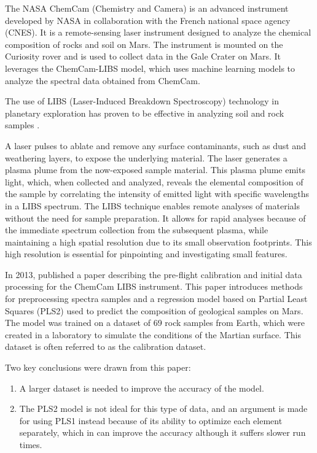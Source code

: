 
The NASA ChemCam (Chemistry and Camera) is an advanced instrument developed by NASA in collaboration with the French national space agency (CNES).
It is a remote-sensing laser instrument designed to analyze the chemical composition of rocks and soil on Mars\cite{chemcam_nasa_website}.
The instrument is mounted on the Curiosity rover and is used to collect data in the Gale Crater on Mars\cite{curiosity_nasa_website}.
It leverages the ChemCam-LIBS model, which uses machine learning models to analyze the spectral data obtained from ChemCam.\cite{andersonImprovedAccuracyQuantitative2017}\cite{cleggRecalibrationMarsScience2017}

The use of LIBS (Laser-Induced Breakdown Spectroscopy) technology in planetary exploration has proven to be effective in analyzing soil and rock samples \cite{knight_characterization_2000}.

A laser pulses to ablate and remove any surface contaminants, such as dust and weathering layers, to expose the underlying material.
The laser generates a plasma plume from the now-exposed sample material.
This plasma plume emits light, which, when collected and analyzed, reveals the elemental composition of the sample by correlating the intensity of emitted light with specific wavelengths in a LIBS spectrum.
The LIBS technique enables remote analyses of materials without the need for sample preparation.
It allows for rapid analyses because of the immediate spectrum collection from the subsequent plasma, while maintaining a high spatial resolution due to its small observation footprints.
This high resolution is essential for pinpointing and investigating small features. \cite{wiens_chemcam_2012}

In 2013, \citeauthor{wiens_pre-flight_2013} published a paper describing the pre-flight calibration and initial data processing for the ChemCam LIBS instrument.
This paper introduces methods for preprocessing spectra samples and a regression model based on Partial Least Squares (PLS2) used to predict the composition of geological samples on Mars.
The model was trained on a dataset of 69 rock samples from Earth, which were created in a laboratory to simulate the conditions of the Martian surface.
This dataset is often referred to as the calibration dataset.

Two key conclusions were drawn from this paper:
\begin{enumerate}
    \item A larger dataset is needed to improve the accuracy of the model.
    \item The PLS2 model is not ideal for this type of data, and an argument is made for using PLS1 instead because of its ability to optimize each element separately, which in can improve the accuracy although it suffers slower run times.
\end{enumerate}

